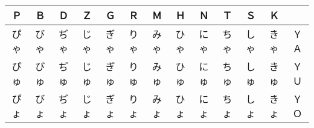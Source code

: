 \begin{center}
\begin{tabular}{|ccccc|ccccccc|c|}
\hline
Ｐ & Ｂ & Ｄ & Ｚ & Ｇ & Ｒ & Ｍ & Ｈ & Ｎ & Ｔ & Ｓ & Ｋ & 　 \\\hline
ぴゃ & びゃ & ぢゃ & じゃ & ぎゃ & りゃ & みゃ & ひゃ & にゃ & ちゃ & しゃ & きゃ & ＹＡ \\
ぴゅ & びゅ & ぢゅ & じゅ & ぎゅ & りゅ & みゅ & ひゅ & にゅ & ちゅ & しゅ & きゅ & ＹＵ \\
ぴょ & びょ & ぢょ & じょ & ぎょ & りょ & みょ & ひょ & にょ & ちょ & しょ & きょ & ＹＯ \\
\hline
\end{tabular}
\end{center}